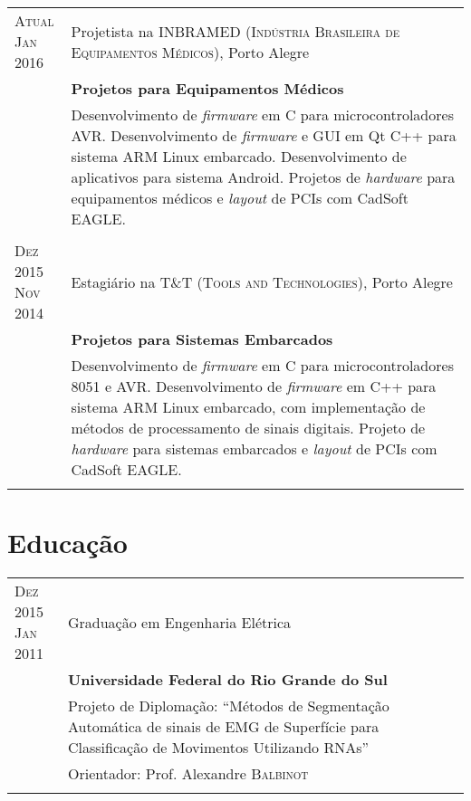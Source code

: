 \documentclass[a4paper,10pt]{article} %
\begin{document}
\begin{tabular}{p{1.5cm}|p{12cm}}

\pbox{20cm}{\textsc{Atual} \\ \textsc{Jan} 2016} & Projetista na \textsc{INBRAMED (Indústria Brasileira de Equipamentos Médicos)}, Porto Alegre \\
& \textbf{Projetos para Equipamentos Médicos}\\ 
& \footnotesize{Desenvolvimento de \textit{firmware} em C para microcontroladores AVR. Desenvolvimento de \textit{firmware} e GUI em Qt C++ para sistema ARM Linux embarcado. Desenvolvimento de aplicativos para sistema Android. Projetos de \textit{hardware} para equipamentos médicos e \textit{layout} de PCIs com CadSoft EAGLE.}\\
\multicolumn{2}{c}{} \\

\pbox{20cm}{\textsc{Dez} 2015 \\ \textsc{Nov} 2014} & Estagiário na \textsc{T\&T (Tools and Technologies)}, Porto Alegre \\
& \textbf{Projetos para Sistemas Embarcados}\\ 
& \footnotesize{Desenvolvimento de \textit{firmware} em C para microcontroladores 8051 e AVR. Desenvolvimento de \textit{firmware} em C++ para sistema ARM Linux embarcado, com implementação de métodos de processamento de sinais digitais. Projeto de \textit{hardware} para sistemas embarcados e \textit{layout} de PCIs com CadSoft EAGLE. }\\
\multicolumn{2}{c}{} \\

\end{tabular}


\section{Educação}

\begin{tabular}{p{1.5cm}|p{12cm}}

\pbox{20cm}{\textsc{Dez} 2015 \\ \textsc{Jan} 2011} & Graduação em Engenharia Elétrica\\
& \textbf{Universidade Federal do Rio Grande do Sul}\\
& \footnotesize{Projeto de Diplomação: ``Métodos de Segmentação Automática de sinais de EMG de Superfície para Classificação de Movimentos Utilizando RNAs''} \\
& \small Orientador: Prof. Alexandre \textsc{Balbinot}\\
\multicolumn{2}{c}{} \\

\end{tabular}
\end{document}
